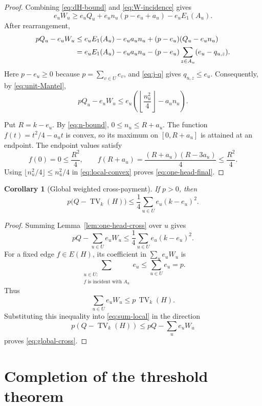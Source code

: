 \documentclass[a4paper,11pt]{amsart}
\numberwithin{equation}{section}
\newtheorem{corollary}[theorem]{Corollary}
\theoremstyle{definition}
\theoremstyle{remark}
\newcommand{\TV}{\operatorname{TV}}
\begin{document}
\begin{proof}
Combining \eqref{eq:dH-bound} and \eqref{eq:W-incidence} gives
\[
e_uW_u\ge e_uQ_u+e_un_u(p-e_u+a_u)-e_uE_1(A_u).
\]
After rearrangement,
\begin{align}
pQ_u-e_uW_u
&\le e_uE_1(A_u)-e_ua_un_u
 +(p-e_u)(Q_u-e_un_u)\notag\\
&=e_uE_1(A_u)-e_ua_un_u
 -(p-e_u)\sum_{z\in A_u}(e_u-q_{u,z}).
\label{eq:pre-relax}
\end{align}
Here $p-e_u\ge0$ because $p=\sum_{v\in U}e_v$, and \eqref{eq:j-q} gives $q_{u,z}\le e_u$.  Consequently, by \eqref{eq:unit-Mantel},
\begin{equation}
pQ_u-e_uW_u
\le e_u\left(\left\lfloor\frac{n_u^2}{4}\right\rfloor-a_un_u\right).
\label{eq:local-convex}
\end{equation}

Put $R=k-e_u$.  By \eqref{eq:n-bound}, $0\le n_u\le R+a_u$.  The function $f(t)=t^2/4-a_ut$ is convex, so its maximum on $[0,R+a_u]$ is attained at an endpoint.  The endpoint values satisfy
\[
f(0)=0\le\frac{R^2}{4},
\qquad
f(R+a_u)=\frac{(R+a_u)(R-3a_u)}{4}\le\frac{R^2}{4}.
\]
Using $\lfloor n_u^2/4\rfloor\le n_u^2/4$ in \eqref{eq:local-convex} proves \eqref{eq:one-head-final}.
\end{proof}

\begin{corollary}[Global weighted cross-payment]\label{cor:global-cross}
If $p>0$, then
\begin{equation}
p\bigl(Q-\TV_k(H)\bigr)
\le\frac14\sum_{u\in U}e_u(k-e_u)^2.
\label{eq:global-cross}
\end{equation}
\end{corollary}

\begin{proof}
Summing Lemma~\ref{lem:one-head-cross} over $u$ gives
\begin{equation}
pQ-\sum_{u\in U}e_uW_u
\le\frac14\sum_{u\in U}e_u(k-e_u)^2.
\label{eq:sum-local}
\end{equation}
For a fixed edge $f\in E(H)$, its coefficient in $\sum_ue_uW_u$ is
\[
\sum_{\substack{u\in U:\\ f\text{ is incident with }A_u}}e_u
\le\sum_{u\in U}e_u=p.
\]
Thus
\[
\sum_{u\in U}e_uW_u\le p\,\TV_k(H).
\]
Substituting this inequality into \eqref{eq:sum-local} in the direction
\[
p(Q-\TV_k(H))\le pQ-\sum_ue_uW_u
\]
proves \eqref{eq:global-cross}.
\end{proof}

\section{Completion of the threshold theorem}\label{sec:threshold-completion}
\end{document}
